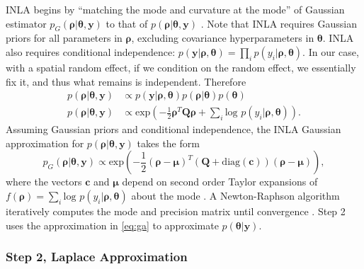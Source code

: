 INLA begins by ``matching the mode and curvature at the mode'' of Gaussian estimator $p_{G}(\pmb{\rho}|\pmb{\theta}, \pmb{y})$ to that of $p(\pmb{\rho}|\pmb{\theta}, \pmb{y})$ \citep{Rue2005}. Note that INLA requires Gaussian priors for all parameters in $\pmb{\rho}$, excluding covariance hyperparameters in $\pmb{\theta}$. INLA also requires conditional independence: $p(\pmb{y}|\pmb{\rho}, \pmb{\theta}) = \prod_{i} p(y_{i}|\pmb{\rho},\pmb{\theta})$. In our case, with a spatial random effect, if we condition on the random effect, we essentially fix it, and thus what remains is independent. Therefore 
\begin{align}
p(\pmb{\rho} |\pmb{\theta},\pmb{y}) & \propto p(\pmb{y}|\pmb{\rho}, \pmb{\theta}) p(\pmb{\rho}|\pmb{\theta}) p(\pmb{\theta}) \nonumber \\
p(\pmb{\rho}|\pmb{\theta},\pmb{y}) & \propto \text{exp}\left(-\frac{1}{2}\pmb{\rho}^{T}\pmb{Q \rho} + \sum_{i} \text{log }p(y_{i}|\pmb{\rho},\pmb{\theta}) \right). \nonumber
\end{align}
Assuming Gaussian priors and conditional independence, the INLA Gaussian approximation for $p(\pmb{\rho}|\pmb{\theta}, \pmb{y})$ takes the form
\begin{equation} \label{eq:ga}
p_{G}(\pmb{\rho}|\pmb{\theta},\pmb{y}) \propto \text{exp} \left( -\frac{1}{2}(\pmb{\rho-\mu})^{T} (\pmb{Q} + \text{diag}(\pmb{c}) ) (\pmb{\rho - \mu}) \right),
\end{equation}
where the vectors $\pmb{c}$ and $\pmb{\mu}$ depend on second order Taylor expansions of $f(\pmb{\rho}) = \sum_{i} \text{log }p(y_{i}|\pmb{\rho},\pmb{\theta})$ about the mode \citep{Lindstrom2014}. A Newton-Raphson algorithm iteratively computes the mode and precision matrix until convergence \citep{Rue2009}. Step 2 uses the approximation in \ref{eq:ga} to approximate $p(\pmb{\theta}|\pmb{y})$.

\subsubsection{Step 2, Laplace Approximation}  %

